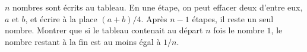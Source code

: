 $n$ nombres sont écrits au tableau. En une étape, on peut effacer deux d'entre eux, $a$ et $b$, et écrire à la place $(a + b)/4$. Après $n - 1$ étapes, il reste un seul nombre. Montrer que si le tableau contenait au départ $n$ fois le nombre $1$, le nombre restant à la fin est au moins égal à $1/n$.
